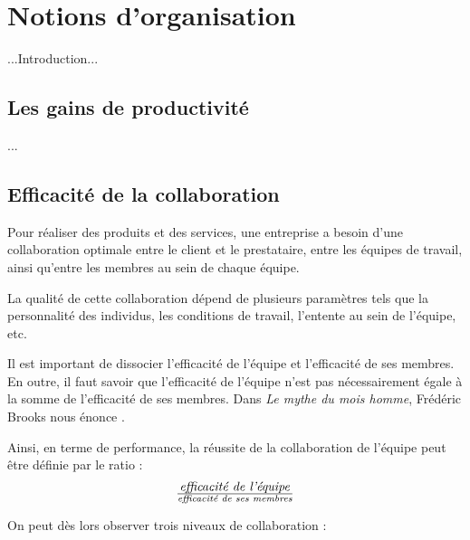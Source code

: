 \chapter{Notions d'organisation}

...Introduction...

\section{Les gains de productivité}

...

\section{Efficacité de la collaboration}

Pour réaliser des produits et des services, une entreprise a besoin d'une collaboration optimale entre le client et le prestataire, entre les équipes de travail, ainsi qu'entre les membres au sein de chaque équipe.

La qualité de cette collaboration dépend de plusieurs paramètres tels que la personnalité des individus, les conditions de travail, l'entente au sein de l'équipe, etc.

Il est important de dissocier l'efficacité de l'équipe et l'efficacité de ses membres. En outre, il faut savoir que l'efficacité de l'équipe n'est pas nécessairement égale à la somme de l'efficacité de ses membres. Dans \textit{Le mythe du mois homme}, Frédéric Brooks nous énonce .

Ainsi, en terme de performance, la réussite de la collaboration de l'équipe peut être définie par le ratio :
\[\text{\textit{efficacité de l'équipe}} \over \text{\textit{efficacité de ses membres}}\]

On peut dès lors observer trois niveaux de collaboration :

